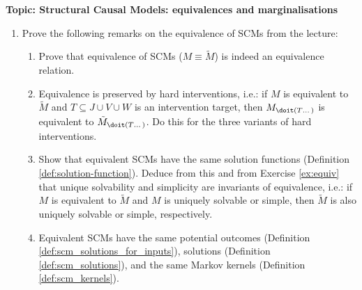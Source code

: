 
\flushleft\textbf{Topic: Structural Causal Models: equivalences and marginalisations}

\begin{enumerate}
  \item %
  Prove the following remarks on the equivalence of SCMs from the lecture:

  \begin{enumerate}
    \item Prove that equivalence of SCMs ($M \equiv \tilde{M}$) is indeed an equivalence relation.
    \item \label{ex:equiv} Equivalence is preserved by hard interventions, i.e.: if $M$ is equivalent to $\tilde{M}$ and $T \subseteq J \cup V \cup W$ is an intervention target, then $M_{\doit(T\dots)}$ is equivalent to $\tilde{M}_{\doit(T\dots)}$. Do this for the three variants of hard interventions.
    \item Show that equivalent SCMs have the same solution functions (Definition \ref*{def:solution-function}). Deduce from this and from Exercise \ref{ex:equiv} that unique solvability and simplicity are invariants of equivalence, i.e.: if $M$ is equivalent to $\tilde{M}$ and $M$ is uniquely solvable or simple, then $\tilde{M}$ is also uniquely solvable or simple, respectively.
    \item Equivalent SCMs have the same potential outcomes (Definition \ref*{def:scm_solutions_for_inputs}), solutions (Definition \ref*{def:scm_solutions}), and the same Markov kernels (Definition \ref*{def:scm_kernels}).
  \end{enumerate}



\end{enumerate}
